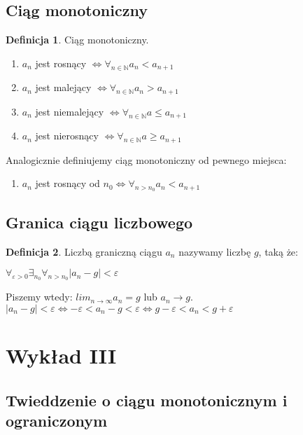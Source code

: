 \documentclass{article}
\theoremstyle{definition}
\newtheorem{de}{Definicja}[subsection]
\theoremstyle{definition}
\theoremstyle{definition}
\theoremstyle{definition}
\begin{document}
\subsection{Ciąg monotoniczny}

\begin{de}
    Ciąg monotoniczny. 
    \begin{enumerate}
        \item $a_n$ jest rosnący $\iff \forall_{n\in\mathbb{N}} a_n<a_{n+1}$
        \item $a_n$ jest malejący $\iff \forall_{n\in\mathbb{N}} a_n>a_{n+1}$
        \item $a_n$ jest niemalejący $\iff \forall_{n\in\mathbb{N}} a\leq a_{n+1}$
        \item $a_n$ jest nierosnący $\iff \forall_{n\in\mathbb{N}} a\geq a_{n+1}$
    \end{enumerate}
    Analogicznie definiujemy ciąg monotoniczny od pewnego miejsca:
    \begin{enumerate}
        \item $a_n$ jest rosnący od $n_0 \iff \forall_{n>n_0} a_n<a_{n+1}$
    \end{enumerate}
\end{de}

\subsection{Granica ciągu liczbowego}

\begin{de}
    Liczbą graniczną ciągu $a_n$ nazywamy liczbę $g$, taką że:
    \begin{center}
        $\forall_{\varepsilon>0}\exists_{n_0}\forall_{n>n_0} |a_n-g|<\varepsilon$
    \end{center}
    Piszemy wtedy: $lim_{n\rightarrow \infty} a_n = g$ lub $a_n\rightarrow g$.\\
    $|a_n-g|<\varepsilon \iff -\varepsilon < a_n -g < \varepsilon \iff g-\varepsilon < a_n < g+\varepsilon$
\end{de}

\section{Wykład III}

\subsection{Twieddzenie o ciągu monotonicznym i ograniczonym}
\end{document}
